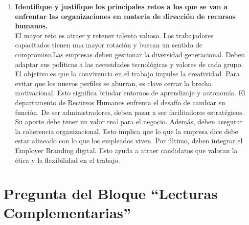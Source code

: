 \documentclass[12pt, a4paper]{article}
\begin{document}
\begin{enumerate}[label=\textbf{\arabic*.}, leftmargin=*, topsep=10pt, itemsep=15pt]
    \item \textbf{Identifique y justifique los principales retos a los que se van a enfrentar las organizaciones en materia de dirección de recursos humanos.} \\
    El mayor reto es atraer y retener talento valioso. Los trabajadores capacitados tienen una mayor 
    rotación y buscan un sentido de compromiso.Las empresas deben gestionar la diversidad 
    generacional. Deben adaptar sus políticas a las necesidades tecnológicas y valores de cada grupo. El objetivo es que la convivencia en el trabajo impulse la creatividad.
    Para evitar que los nuevos perfiles se aburran, es clave cerrar la brecha motivacional. 
    Esto significa brindar entornos de aprendizaje y autonomía.
    El departamento de Recursos Humanos enfrenta el desafío de cambiar su función. 
    De ser administradores, deben pasar a ser facilitadores estratégicos. Su aporte
    debe tener un valor real para el negocio.
    Además, deben asegurar la coherencia organizacional. Esto implica que lo que la empresa 
    dice debe estar alineado con lo que los empleados viven.
    Por último, deben integrar el Employer Branding digital.
    Esto ayuda a atraer candidatos que valoran la ética y la flexibilidad en el trabajo.

\end{enumerate}

\vspace{1cm}

\section{Pregunta del Bloque ``Lecturas Complementarias''}
\end{document}
